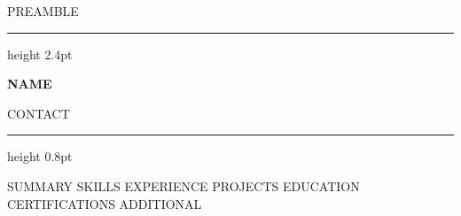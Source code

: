 %
%
{{PREAMBLE}}


\renewcommand{\cvsectionfont}[1]{{\large\bfseries\color{cvaccent} #1}}
\renewcommand{\cvsectionrule}{\vspace{2pt}{\color{cvaccent}\hrule height 1.4pt}}
\renewcommand{\cventryfont}[1]{{\bfseries\color{cvaccent} #1}}

\renewcommand{\cvheader}[2]{%
  {\color{cvaccent}\hrule height 2.4pt}%
  \vspace{6pt}%
  {\fontsize{24}{27}\selectfont\bfseries\color{cvaccent} #1}\par\vspace{4pt}%
  {\small\color{cvmuted} #2}\par\vspace{6pt}%
  {\color{cvaccent}\hrule height 0.8pt}%
  \vspace{2pt}%
}



\cvheader{ {{NAME}} }{ {{CONTACT}} }

{{SUMMARY}}
{{SKILLS}}
{{EXPERIENCE}}
{{PROJECTS}}
{{EDUCATION}}
{{CERTIFICATIONS}}
{{ADDITIONAL}}


